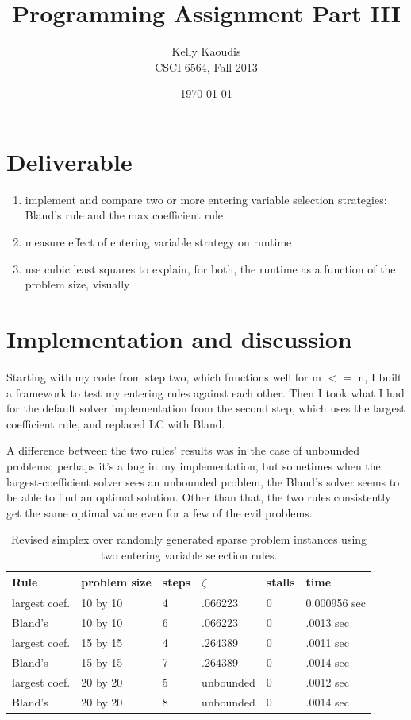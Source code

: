 \documentclass[9pt]{article}
\title{Programming Assignment Part III}
\author{
    Kelly Kaoudis \\
    CSCI 6564, Fall 2013 \\
}
\date{\today}
\begin{document}
\maketitle

\section{Deliverable}
\begin{enumerate}
    \item implement and compare two or more entering variable
    selection strategies: Bland's rule and the max coefficient
    rule
    \item measure effect of entering variable strategy on runtime
    \item use cubic least squares to explain, for both, the runtime
    as a function of the problem size, visually
\end{enumerate}

\section{Implementation and discussion}
Starting with my code from step two, which functions well for m $<=$ n,
I built a framework to test my entering rules against each other. Then I
took what I had for the default solver implementation from the second
step, which uses the largest coefficient rule, and replaced LC with Bland.

A difference between the two rules' results was in the case of unbounded
problems; perhaps it's a bug in my implementation, but sometimes
when the largest-coefficient
solver sees an unbounded problem, the Bland's solver seems
to be able to find an optimal solution. Other than that, the two rules consistently get the same optimal value even for a few of the evil problems.

\begin{table}[ht]
\centering
\begin{small}
\begin{tabular}{l l l l l l}
    Rule & problem size & steps & $\zeta$ & stalls & time \\ [0.5ex]
    \hline
    largest coef. & 10 by 10 & 4 & .066223 & 0 & 0.000956 sec \\
    Bland's & 10 by 10 & 6 & .066223 & 0 & .0013 sec \\
    largest coef. &  15 by 15 & 4 & .264389 & 0 & .0011 sec \\
    Bland's & 15 by 15 & 7 & .264389 & 0 & .0014 sec \\
    largest coef. & 20 by 20 & 5 & unbounded & 0 & .0012 sec \\
    Bland's & 20 by 20 & 8 & unbounded & 0 & .0014 sec \\
\end{tabular}
\caption{Revised simplex over randomly generated sparse problem instances using two entering variable selection rules.}
\end{small}
\end{table}
\end{document}
